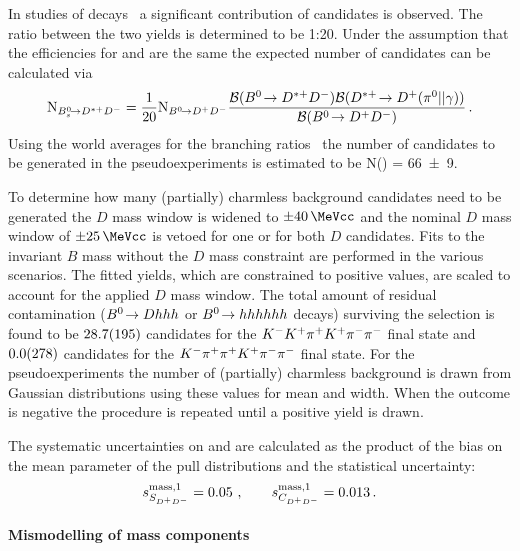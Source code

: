 In studies of \BdToDstD decays~\cite{BToDstDthesis} a significant contribution
of \BsToDstD candidates is observed. The ratio between the two yields is
determined to be 1:20. Under the assumption that the efficiencies for \BToDD
and \BToDstD are the same the expected number of \BsToDstD candidates can be
calculated via
\begin{align}
	\text{N}_{{{B}^0_{s}}\!\rightarrow {\ensuremath{{D}^{*+}}}{\ensuremath{{D}^-}}} = \frac{1}{20} \text{N}_{{{B}^0}\!\rightarrow {\ensuremath{{D}^+}}{\ensuremath{{D}^-}}} \frac{\mathcal{B}({{B}^0}\!\rightarrow {\ensuremath{{D}^{*+}}}{\ensuremath{{D}^-}}) \mathcal{B}({{D}^{*+}} \!\rightarrow {\ensuremath{{D}^+}} ({{\pi}^0} || \gamma))}{\mathcal{B}({{B}^0}\!\rightarrow {\ensuremath{{D}^+}}{\ensuremath{{D}^-}})} \,.
\end{align}
Using the world averages for the branching ratios~\cite{PDG2016} the number of
candidates to be generated in the pseudoexperiments is estimated to be
N(\BsToDstD) = \num{66\pm9}.

To determine how many (partially) charmless background candidates need to be
generated the $D$ mass window is widened to $\SI{\pm40}{\MeVcc}$ and the
nominal $D$ mass window of $\SI{\pm25}{\MeVcc}$ is vetoed for one or for both
$D$ candidates. Fits to the invariant $B$ mass without the $D$ mass constraint
are performed in the various scenarios. %
%
The fitted yields, which are constrained to positive values, are scaled to
account for the applied $D$ mass window. The total amount of residual
contamination (${{B}^0}\!\rightarrow D hhh$ or ${{B}^0}\!\rightarrow hhhhhh$ decays) surviving the
\BdToDD selection is found to be $\num{28.7\pm19.5}$ candidates for the
${{K}^-}{{K}^+}{{\pi}^+}{{K}^+}{{\pi}^-}{{\pi}^-}$ final state and $\num{0.0\pm27.8}$ candidates for the
${{K}^-}{{\pi}^+}{{\pi}^+}{{K}^+}{{\pi}^-}{{\pi}^-}$ final state. For the pseudoexperiments the number of (partially)
charmless background is drawn from Gaussian distributions using these values
for mean and width. When the outcome is negative the procedure is repeated
until a positive yield is drawn.

The systematic uncertainties on \SDD and \CDD are calculated as the product of
the bias on the mean parameter of the pull distributions and the statistical
uncertainty:
\begin{align*}
s_{S_{{{D}^+}{{D}^-}}}^{\text{mass,1}} = \num{0.05}\ , \qquad s_{C_{{{D}^+}{{D}^-}}}^{\text{mass,1}} = \num{0.013}\,.
\end{align*}

\paragraph{Mismodelling of mass components}

